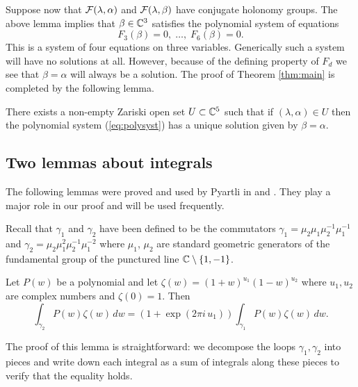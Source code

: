 Suppose now that $\mathcal{F}(\lambda,\alpha)$ and $\mathcal{F}(\lambda,\beta)$ have conjugate holonomy groups. The above lemma implies that $\beta\in\mathbb{C}^3$ satisfies the polynomial system of equations
\begin{equation}\label{eq:polysyst}
 F_3(\beta)=0,\;\ldots ,\;F_6(\beta)=0.
\end{equation}
This is a system of four equations on three variables. Generically such a system will have no solutions at all. However, because of the defining property of $F_d$ we see that $\beta=\alpha$ will always be a solution. The proof of Theorem \ref{thm:main} is completed by the following lemma.

\begin{elimination}\label{lemma:elimination}
There exists a non-empty Zariski open set $U\subset\mathbb{C}^5$ such that if $(\lambda,\alpha)\in U$ then the polynomial system \textnormal{(\ref{eq:polysyst})} has a unique solution given by $\beta=\alpha$.
\end{elimination}






\subsection{Two lemmas about integrals}\label{subsec:lemmasintegrals}

The following lemmas were proved and used by Pyartli in \cite{Pyartli2000} and \cite{Pyartli2006}. They play a major role in our proof and will be used frequently.

Recall that $\gamma_1$ and $\gamma_2$ have been defined to be the commutators $\gamma_1=\mu_2\mu_1\mu_2^{-1}\mu_1^{-1}$ and $\gamma_2=\mu_2\mu_1^2\mu_2^{-1}\mu_1^{-2}$ where $\mu_1$, $\mu_2$ are standard geometric generators of the fundamental group of the punctured line $\mathbb{C}\setminus\{1,-1\}$.

\begin{lemma}\label{lemma:integrals1}
Let $P(w)$ be a polynomial and let $\zeta(w)=(1+w)^{u_1}(1-w)^{u_2}$ where $u_1,u_2$ are complex numbers and $\zeta(0)=1$. Then
\[ \int_{\gamma_2}P(w)\zeta(w)\,dw = (1+\exp{(2\pi i\,u_1)})\int_{\gamma_1}P(w)\zeta(w)\,dw. \]
\end{lemma}

The proof of this lemma is straightforward: we decompose the loops $\gamma_1,\gamma_2$ into pieces and write down each integral as a sum of integrals along these pieces to verify that the equality holds. 

